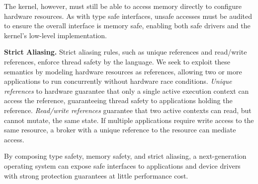 
The kernel, however, must still be able to access memory directly
to configure hardware resources.
As with type safe interfaces, unsafe accesses must be audited to ensure
the overall interface is memory safe, enabling both safe drivers and
the kernel's low-level implementation.

\textbf{Strict Aliasing.}
Strict aliasing rules, such as unique references and read/write references,
enforce thread safety
by the language. We seek to
exploit these semantics
by modeling
hardware resources as references, allowing two or more applications to run
concurrently without
hardware race conditions.
\textit{Unique references}
to hardware
guarantee that only a single active execution context
can access the reference,
guaranteeing thread safety to applications holding the reference.
\textit{Read/write references} guarantee that two active contexts can read, but cannot mutate,
the same state.
If multiple applications require write access to the same resource, a broker with a
unique reference to the resource can mediate access.

By composing type safety, memory safety, and strict aliasing, a next-generation
operating system can expose safe interfaces to applications and device drivers
with strong protection guarantees at little performance cost.
